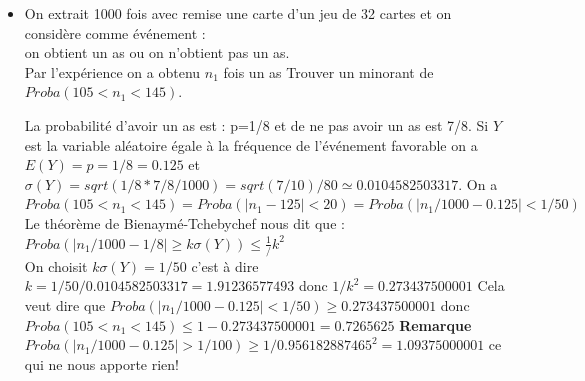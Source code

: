 \documentclass[a4paper,11pt]{book}
\begin{document}
\begin{itemize}
Si $Y$ est la variable al\'eatoire \'egale \`a la fr\'equence de 
l'\'ev\'enement favorable on a $E(Y)=p=1/6 \simeq 0.166666666667$ et 
$\sigma(Y)=sqrt(1/6*5/6/6000)=sqrt(5/60)/60 \simeq 0.00481125224325$
On cherche $k$ pour avoir $k \sigma(Y)= k sqrt(5/60)/60\leq 1/100$\\
on prend $k=2.07846096908$ car $k\leq 6/sqrt(50/6)\simeq 2.07846096908$\\
donc $Proba(|n_1/6000-1/6| \geq 1/100)<1/2.07846096908^2\simeq 0.231481481482$\\
Cela veut dire que : $n_1/6000$ se trouve dans l'intervalle \\
$1/6-1/100\simeq 0.16566666666667;1/6+1/10 \simeq 0.176666666667$ avec la 
probabilit\'e $1-0.231481481482=0.768518518518$ ou encore que $n_1$ se 
trouve dans l'intervalle $940; 1060$ avec la probabilit\'e de 0.768518518518.
{\bf Remarque} En approchant la loi binomiale par la loi normale de moyenne
$n*p=6000*1/6=1000$ et d'\'ecart type 
$\sigma=sqrt(np(1-p)=sqrt(6000*1/6*5/6)\simeq 28.8675134595$
On a $60/28.8675134595=2.07846096908$
On cherche dans une table $\psi(t)=Prob(0<T<t)=\psi(2.07846096908)$ et on 
trouve 0.481. Donc $Prob(-t<T<t)=2*0.481=0.962$
ou dans une table $\Pi(t)=Prob(-\infty<T<t)=\Pi(2.07846096908)$ et on 
trouve 0.981. Donc $Prob(-t<T<t)=2*0.981-1=0.962$
donc  $n_1$ se trouve dans l'intervalle
$940; 1060$ avec la probabilit\'e de 0.481*2=0.962.

\item On extrait 1000 fois avec remise une carte d'un jeu de 32 cartes
et on consid\`ere comme \'ev\'enement :\\
on obtient un as ou on n'obtient pas un as.\\
Par l'exp\'erience on a obtenu $n_1$ fois un as
Trouver  un minorant de  $Proba(105<n_1<145)$.

La probabilit\'e d'avoir un as est : p=1/8 et de ne pas avoir un as est 7/8.
Si $Y$ est la variable al\'eatoire \'egale \`a la fr\'equence de 
l'\'ev\'enement favorable on a $E(Y)=p=1/8=0.125$ et 
$\sigma(Y)=sqrt(1/8*7/8/1000)=sqrt(7/10)/80\simeq 0.0104582503317$.
On a $Proba(105<n_1<145)=Proba(|n_1-125|<20)=Proba(|n_1/1000-0.125|<1/50)$
Le th\'eor\`eme de Bienaym\'e-Tchebychef nous dit que :\\
$Proba(|n_1/1000-1/8| \geq k \sigma(Y))\leq \frac{1}/{k^2}$\\
On choisit $k \sigma(Y)=1/50$ c'est \`a dire 
$k=1/50/0.0104582503317=1.91236577493$ donc $1/k^2=0.273437500001$
Cela veut dire que 
$Proba(|n_1/1000-0.125|<1/50) \geq 0.273437500001$ donc\\
$Proba(105<n_1<145) \leq 1-0.273437500001=0.7265625$
{\bf Remarque} 
$Proba(|n_1/1000-0.125|>1/100) \geq 1/0.956182887465^2=1.09375000001$
ce qui ne nous apporte rien!
\end{itemize}
\end{document}
